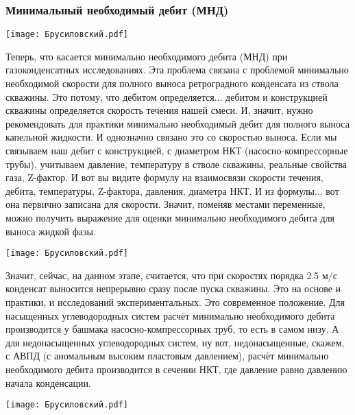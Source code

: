 \documentclass[main.tex]{subfiles}
\begin{document}
\subsubsection{Минимальный необходимый дебит (МНД)}

\begin{center}
\texttt{[image: Брусиловский.pdf]}
\end{center}

Теперь, что касается минимально необходимого дебита (МНД) при газоконденсатных исследованиях.
Эта проблема связана с проблемой минимально необходимой скорости для полного выноса ретроградного конденсата из ствола скважины.
Это потому, что дебитом определяется... дебитом и конструкцией скважины определяется скорость течения нашей смеси.
И, значит, нужно рекомендовать для практики минимально необходимый дебит для полного выноса капельной жидкости.
И однозначно связано это со скоростью выноса.
Если мы связываем наш дебит с конструкцией, с диаметром НКТ (насосно-компрессорные трубы), учитываем давление, температуру в стволе скважины, реальные свойства газа, Z-фактор.
И вот вы видите формулу на взаимосвязи скорости течения, дебита, температуры, Z-фактора, давления, диаметра НКТ.
И из формулы... вот она первично записана для скорости.
Значит, поменяв местами переменные, можно получить выражение для оценки минимально необходимого дебита для выноса жидкой фазы.

\begin{center}
\texttt{[image: Брусиловский.pdf]}
\end{center}

Значит, сейчас, на данном этапе, считается, что при скоростях порядка 2.5 м/с конденсат выносится непрерывно сразу после пуска скважины.
Это на основе и практики, и исследований экспериментальных.
Это современное положение.
Для насыщенных углеводородных систем расчёт минимально необходимого дебита производится у башмака насосно-компрессорных труб, то есть в самом низу.
А для недонасыщенных углеводородных систем, ну вот, недонасыщенные, скажем, с АВПД (с аномальным высоким пластовым давлением), расчёт минимально необходимого дебита производится в сечении НКТ, где давление равно давлению начала конденсации.

\begin{center}
\texttt{[image: Брусиловский.pdf]}
\end{center}
\end{document}

